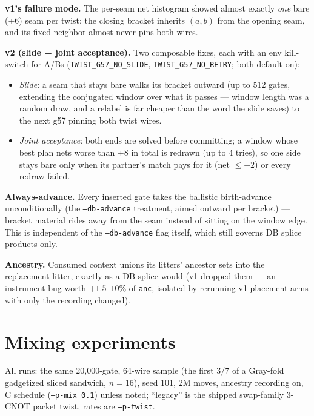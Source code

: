 \documentclass[11pt]{article}
\newcommand{\code}[1]{\texttt{#1}}
\begin{document}
\textbf{v1's failure mode.} The per-seam net histogram showed almost exactly
\emph{one} bare (+6) seam per twist: the closing bracket inherits $(a,b)$
from the opening seam, and its fixed neighbor almost never pins both wires.

\textbf{v2 (slide + joint acceptance).} Two composable fixes, each with an
env kill-switch for A/Bs (\code{TWIST\_G57\_NO\_SLIDE},
\code{TWIST\_G57\_NO\_RETRY}; both default on):
\begin{itemize}
\item \emph{Slide}: a seam that stays bare walks its bracket outward (up to
512 gates, extending the conjugated window over what it passes --- window
length was a random draw, and a relabel is far cheaper than the word the
slide saves) to the next g57 pinning both twist wires.
\item \emph{Joint acceptance}: both ends are solved before committing; a
window whose best plan nets worse than $+8$ in total is redrawn (up to 4
tries), so one side stays bare only when its partner's match pays for it
(net $\le +2$) or every redraw failed.
\end{itemize}

\textbf{Always-advance.} Every inserted gate takes the ballistic
birth-advance unconditionally (the \code{--db-advance} treatment, aimed
outward per bracket) --- bracket material rides away from the seam instead of
sitting on the window edge. This is independent of the \code{--db-advance}
flag itself, which still governs DB splice products only.

\textbf{Ancestry.} Consumed context unions its litters' ancestor sets into
the replacement litter, exactly as a DB splice would (v1 dropped them ---
an instrument bug worth $+1.5$--$10\%$ of \code{anc}, isolated by rerunning
v1-placement arms with only the recording changed).

\section{Mixing experiments}

All runs: the same 20{,}000-gate, 64-wire sample (the first $3/7$ of a Gray-fold
gadgetized sliced sandwich, $n{=}16$), seed 101, 2M moves, ancestry recording
on, C schedule (\code{--p-mix 0.1}) unless noted; ``legacy'' is the shipped
swap-family 3-CNOT packet twist, rates are \code{--p-twist}.
\end{document}
